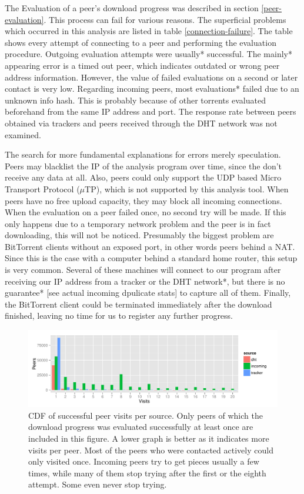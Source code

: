 \documentclass[10pt, a4paper, twoside, headsepline]{scrbook}
\renewcommand{\_}{\origunderscore\allowbreak}
\begin{document}
The Evaluation of a peer's download progress was described in section \ref{peer-evaluation}. This process can fail for various reasons. The superficial problems which occurred in this analysis are listed in table \ref{connection-failure}. The table shows every attempt of connecting to a peer and performing the evaluation procedure. Outgoing evaluation attempts were usually* successful. The mainly* appearing error is a timed out peer, which indicates outdated or wrong peer address information. However, the value of failed evaluations on a second or later contact is very low. Regarding incoming peers, most evaluations* failed due to an unknown info hash. This is probably because of other torrents evaluated beforehand from the same IP address and port. The response rate between peers obtained via trackers and peers received through the DHT network was not examined.

The search for more fundamental explanations for errors merely speculation. Peers may blacklist the IP of the analysis program over time, since the don't receive any data at all. Also, peers could only support the UDP based Micro Transport Protocol ($\mu$TP), which is not supported by this analysis tool. When peers have no free upload capacity, they may block all incoming connections. When the evaluation on a peer failed once, no second try will be made. If this only happens due to a temporary network problem and the peer is in fact downloading, this will not be noticed. Presumably the biggest problem are BitTorrent clients without an exposed port, in other words peers behind a NAT. Since this is the case with a computer behind a standard home router, this setup is very common. Several of these machines will connect to our program after receiving our IP address from a tracker or the DHT network*, but there is no guarantee* [see actual incoming dpulicate stats] to capture all of them. Finally, the BitTorrent client could be terminated immediately after the download finished, leaving no time for us to register any further progress.

\begin{figure}
\centering
\includegraphics[width=\textwidth, page=2]{../result/2015-08-30_20-combined_visits}
\caption[CDF of successful peer visits per source]{CDF of successful peer visits per source. Only peers of which the download progress was evaluated successfully at least once are included in this figure. A lower graph is better as it indicates more visits per peer. Most of the peers who were contacted actively could only visited once. Incoming peers try to get pieces usually a few times, while many of them stop trying after the first or the eighth attempt. Some even never stop trying.}
\label{visits}
\end{figure}
\end{document}
